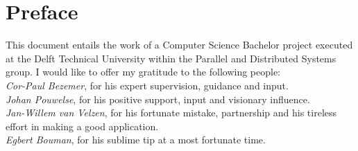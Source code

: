 \chapter*{Preface}
This document entails the work of a Computer Science Bachelor project executed at the Delft Technical University within the Parallel and Distributed Systems group. I would like to offer my gratitude to the following people: \\

\emph{Cor-Paul Bezemer}, for his expert supervision, guidance and input.\\

\emph{Johan Pouwelse}, for his positive support, input and visionary influence.\\

\emph{Jan-Willem van Velzen}, for his fortunate mistake, partnership and his tireless effort in making a good application.\\

\emph{Egbert Bouman}, for his sublime tip at a most fortunate time.\\